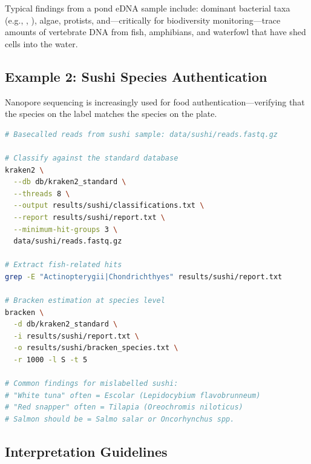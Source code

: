 Typical findings from a pond \acrshort{eDNA} sample include: dominant bacterial taxa (e.g., , ), algae, protists, and---critically for biodiversity monitoring---trace amounts of vertebrate DNA from fish, amphibians, and waterfowl that have shed cells into the water.

\subsection{Example 2: Sushi Species Authentication}
\label{subsec:diyanalysis:sushi}

Nanopore sequencing is increasingly used for food authentication---verifying that the species on the label matches the species on the plate.

\begin{lstlisting}[language=bash,caption={Sushi species authentication analysis.},label=lst:diy-sushi]
# Basecalled reads from sushi sample: data/sushi/reads.fastq.gz

# Classify against the standard database
kraken2 \
  --db db/kraken2_standard \
  --threads 8 \
  --output results/sushi/classifications.txt \
  --report results/sushi/report.txt \
  --minimum-hit-groups 3 \
  data/sushi/reads.fastq.gz

# Extract fish-related hits
grep -E "Actinopterygii|Chondrichthyes" results/sushi/report.txt

# Bracken estimation at species level
bracken \
  -d db/kraken2_standard \
  -i results/sushi/report.txt \
  -o results/sushi/bracken_species.txt \
  -r 1000 -l S -t 5

# Common findings for mislabelled sushi:
# "White tuna" often = Escolar (Lepidocybium flavobrunneum)
# "Red snapper" often = Tilapia (Oreochromis niloticus)
# Salmon should be = Salmo salar or Oncorhynchus spp.
\end{lstlisting}

\subsection{Interpretation Guidelines}
\label{subsec:diyanalysis:meta_interpretation}

